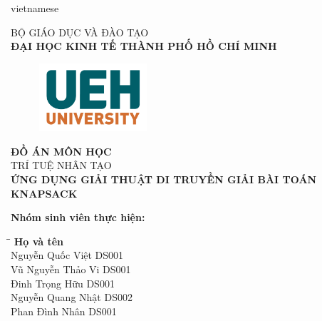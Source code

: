 \documentclass[a4paper]{article}
\begin{document}
\fontsize{13pt}{15pt}\selectfont
\setlength{\parindent}{0cm}
\setlength{\parskip}{1.5ex}
\setlength{\baselineskip}{1.5\baselineskip}
\begin{otherlanguage*}{vietnamese}
\begin{titlepage}

 
\begin{center}

\Large BỘ GIÁO DỤC VÀ ĐÀO TẠO\\[7pt]
\textbf{\Large ĐẠI HỌC KINH TẾ THÀNH PHỐ HỒ CHÍ MINH}\\[1cm]
\begin{figure}[!h]
    \centering
    \includegraphics[width=4cm]{ueh.png}
\end{figure}

\vspace{1cm}

\Large\textbf{ĐỒ ÁN MÔN HỌC}\\[0.5cm]
\Large{TRÍ TUỆ NHÂN TẠO}\\ [1cm]
\Large\textbf{ỨNG DỤNG GIẢI THUẬT DI TRUYỀN GIẢI BÀI TOÁN KNAPSACK}
\end{center}
\vspace{1cm}

\textbf{{Nhóm sinh viên thực hiện:}}

\begin{tabbing}
\hspace{8cm}\=\hspace{6cm}\=\hspace{6cm} \kill
{\textbf{Họ và tên}}\\
Nguyễn Quốc Việt  \> DS001\\
Vũ Nguyễn Thảo Vi  \> DS001\\
Đinh Trọng Hữu  \> DS001\\
Nguyễn Quang Nhật  \> DS002\\
Phan Đình Nhân  \> DS001\\
\end{tabbing}


\end{titlepage}
\end{otherlanguage*}
\end{document}
